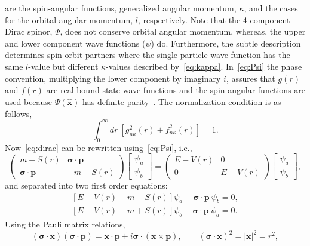 are the spin-angular functions, generalized angular momentum, $\kappa$, and the cases for the orbital angular momentum, $l$, respectively. Note that the 4-component Dirac spinor, $\Psi$, does not conserve orbital angular momentum, whereas, the upper and lower component wave functions ($\psi$) do. Furthermore, the subtle description determines spin orbit partners where the single particle wave function has the same $l$-value but different $\kappa$-values described by~\eqref{eq:kappa}. In~\eqref{eq:Psi} the phase convention, multiplying the lower component by imaginary $i$, assures that $g(r)$ and $f(r)$ are real bound-state wave functions and the spin-angular functions are used because $\Psi(\hat{\mathbf{x}})$ has definite parity~\cite{sakurai:1987:advanced}. The normalization condition is as follows,
\begin{equation}
\int _0^{\infty} dr\ [g_{n\kappa}^2(r)+f_{n\kappa}^2(r)]=1.
\end{equation}
Now~\eqref{eq:dirac} can be rewritten using~\eqref{eq:Psi}, i.e.,
\begin{equation}
\begin{pmatrix}
m+S(r) & \boldsymbol{\sigma} \cdot \mathbf{p} \\
\boldsymbol{\sigma} \cdot \mathbf{p} & -m-S(r)
\end{pmatrix}
\begin{bmatrix}
\psi _a \\
\psi _b
\end{bmatrix}
=
\begin{pmatrix}
E-V(r) & 0 \\
0 & E-V(r)
\end{pmatrix}
\begin{bmatrix}
\psi _a \\
\psi _b
\end{bmatrix},
\end{equation}
and separated into two first order equations:
\begin{equation}\label{eq:dirac1}
\begin{gathered}
\left[ E-V(r)-m-S(r) \right]\psi _a - \boldsymbol{\sigma} \cdot \mathbf{p}\ \psi _b = 0, 
\\
\left[ E-V(r)+m+S(r)\right]\psi _b - \boldsymbol{\sigma} \cdot \mathbf{p}\ \psi _a = 0.
\end{gathered}
\end{equation}
Using the Pauli matrix relations, 
\begin{equation}
(\boldsymbol{\sigma}\cdot \mathbf{x})(\boldsymbol{\sigma}\cdot \mathbf{p})= \mathbf{x\cdot p} + i \boldsymbol{\sigma}\cdot (\mathbf{x}\times\mathbf{p}),\qquad 
(\boldsymbol{\sigma}\cdot \mathbf{x})^2=|\mathbf{x}|^2=r^2,
\end{equation}
